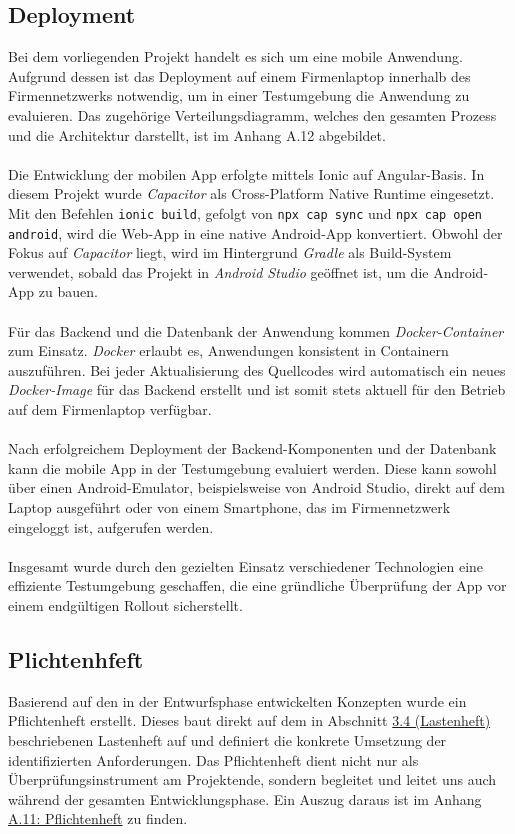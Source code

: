 \documentclass[a4paper,12pt]{article}
\begin{document}
\subsection{Deployment}
\label{sec:deployment}
Bei dem vorliegenden Projekt handelt es sich um eine mobile Anwendung. Aufgrund dessen ist das Deployment auf einem Firmenlaptop innerhalb des Firmennetzwerks notwendig, um in einer Testumgebung die Anwendung zu evaluieren. Das zugehörige Verteilungsdiagramm, welches den gesamten Prozess und die Architektur darstellt, ist im Anhang A.12 abgebildet.\\
\\
Die Entwicklung der mobilen App erfolgte mittels Ionic auf Angular-Basis. In diesem Projekt wurde \textit{Capacitor} als Cross-Platform Native Runtime eingesetzt. Mit den Befehlen \texttt{ionic build}, gefolgt von \texttt{npx cap sync} und \texttt{npx cap open android}, wird die Web-App in eine native Android-App konvertiert. Obwohl der Fokus auf \textit{Capacitor} liegt, wird im Hintergrund \textit{Gradle} als Build-System verwendet, sobald das Projekt in \textit{Android Studio} geöffnet ist, um die Android-App zu bauen.
\\
\\
Für das Backend und die Datenbank der Anwendung kommen \textit{Docker-Container} zum Einsatz. \textit{Docker} erlaubt es, Anwendungen konsistent in Containern auszuführen. Bei jeder Aktualisierung des Quellcodes wird automatisch ein neues \textit{Docker-Image} für das Backend erstellt und ist somit stets aktuell für den Betrieb auf dem Firmenlaptop verfügbar.\\
\\
Nach erfolgreichem Deployment der Backend-Komponenten und der Datenbank kann die mobile App in der Testumgebung evaluiert werden. Diese kann sowohl über einen Android-Emulator, beispielsweise von Android Studio, direkt auf dem Laptop ausgeführt oder von einem Smartphone, das im Firmennetzwerk eingeloggt ist, aufgerufen werden.\\
\\
Insgesamt wurde durch den gezielten Einsatz verschiedener Technologien eine effiziente Testumgebung geschaffen, die eine gründliche Überprüfung der App vor einem endgültigen Rollout sicherstellt.


\subsection{Plichtenhfeft}
Basierend auf den in der Entwurfsphase entwickelten Konzepten wurde ein Pflichtenheft erstellt. Dieses baut direkt auf dem in Abschnitt \hyperref[sec:lastenheft]{3.4 (Lastenheft)} beschriebenen Lastenheft auf und definiert die konkrete Umsetzung der identifizierten Anforderungen. Das Pflichtenheft dient nicht nur als Überprüfungsinstrument am Projektende, sondern begleitet und leitet uns auch während der gesamten Entwicklungsphase. Ein Auszug daraus ist im Anhang \hyperref[sec:pflichtenheft]{A.11: Pflichtenheft} zu finden.
\end{document}
